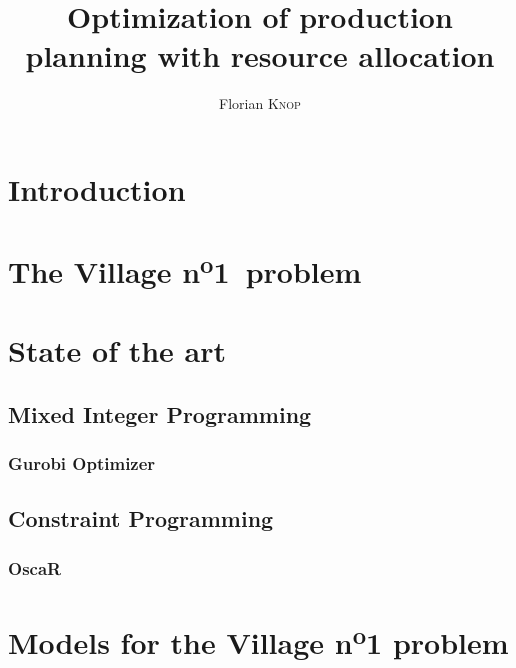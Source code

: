 \documentclass{template/EPL-master-thesis-covers-EN}
\title{Optimization of production planning with resource allocation}
\author{Florian \textsc{Knop}}
\begin{document}
  
  \def\chapterautorefname{Chapter}
  \newcommand{\vone}{Village n\textsuperscript{o}1}

  
  \maketitle

  \tableofcontents

  \chapter{Introduction}
  \label{chapter:introduction}
  

  \chapter{The \vone\ problem}
  \label{chapter:problem}
  


  \chapter{State of the art}
  \label{chapter:sota}

  \section{Mixed Integer Programming}
  

  \subsection{Gurobi Optimizer}
  \label{subsection:gurobi}
  

  \section{Constraint Programming}
  

  \subsection{OscaR}
  \label{subsection:oscar}
  
  
  \chapter{Models for the Village n\textsuperscript{o}1 problem}
  \label{chapter:models}
\end{document}
